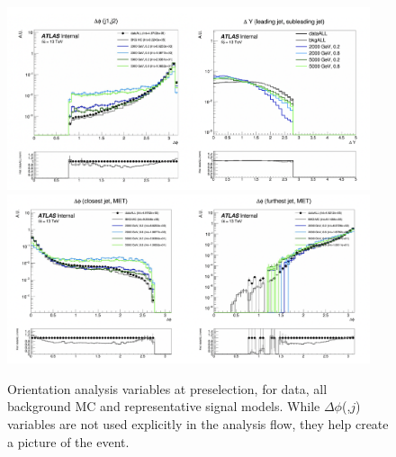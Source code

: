 \begin{figure}[!htbp]
\centering
    \includegraphics[width=0.95\textwidth]{figures/eventsel/preselection/presel3}
    \includegraphics[width=0.95\textwidth]{figures/eventsel/preselection/presel4}
     \caption{Orientation analysis variables at preselection, for data, all background MC and representative signal models. While $\Delta\phi$(\met,$j$) variables are not used explicitly in the analysis flow, they help create a picture of the event.
    \label{fig:presel_vars2}}
\end{figure}

%




